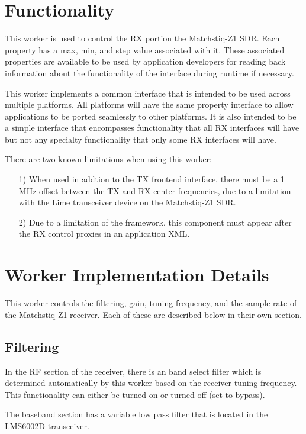 \documentclass{article}
\begin{document}
\section*{Functionality}
\begin{flushleft}
	This worker is used to control the RX portion the Matchstiq-Z1 SDR.  Each property has a max, min, and step value associated with it.  These associated properties are available to be used by application developers for reading back information about the functionality of the interface during runtime if necessary.\par\medskip
	This worker implements a common interface that is intended to be used across multiple platforms.  All platforms will have the same property interface to allow applications to be ported seamlessly to other platforms.  It is also intended to be a simple interface that encompasses functionality that all RX interfaces will have but not any specialty functionality that only some RX interfaces will have.\par\medskip
	There are two known limitations when using this worker:
	\begin{itemize}
		\item[1)] When used in addtion to the TX frontend interface, there must be a 1 MHz offset between the TX and RX center frequencies, due to a limitation with the Lime transceiver device on the Matchstiq-Z1 SDR.
		\item[2)] Due to a limitation of the framework, this component must appear after the RX control proxies in an application XML.
	\end{itemize}

\section*{Worker Implementation Details}
	This worker controls the filtering, gain, tuning frequency, and the sample rate of the Matchstiq-Z1 receiver.  Each of these are described below in their own section.
\end{flushleft}
\subsection*{Filtering}
In the RF section of the receiver, there is an band select filter which is determined automatically by this worker based on the receiver tuning frequency.  This functionality can either be turned on or turned off (set to bypass).\par\medskip
\noindent The baseband section has a variable low pass filter that is located in the LMS6002D transceiver.
\end{document}
